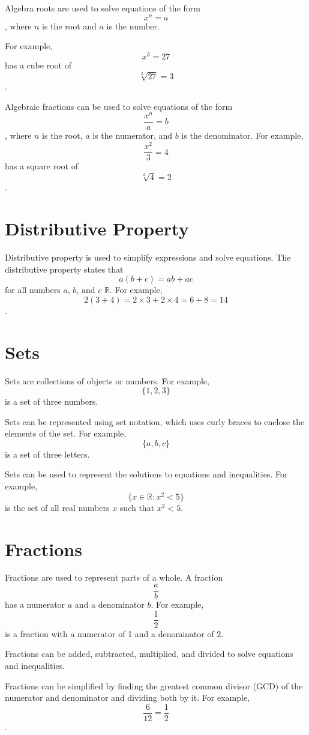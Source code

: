 \documentclass{article}
\begin{document}
Algebra roots are used to solve equations of the form $$x^n = a$$, where $n$ is the root and $a$ is the number.

For example, $$x^3 = 27$$ has a cube root of $$\sqrt[3]{27} = 3$$.

Algebraic fractions can be used to solve equations of the form $$\frac{x^n}{a} = b$$, where $n$ is the root, $a$ is the numerator, and $b$ is the denominator. For example, $$\frac{x^2}{3} = 4$$ has a square root of $$\sqrt[2]{4} = 2$$.

\section{Distributive Property}

Distributive property is used to simplify expressions and solve equations.
The distributive property states that $$a(b + c) = ab + ac$$ for all numbers $a$, $b$, and $c$ \in $\mathbb{R}$.  For example, $$2(3 + 4) = 2 \times 3 + 2 \times 4 = 6 + 8 = 14$$.


\section{Sets}

Sets are collections of objects or numbers. For example, $$\{1, 2, 3\}$$ is a set of three numbers.

Sets can be represented using set notation, which uses curly braces to enclose the elements of the set. For example, $$\{a, b, c\}$$ is a set of three letters.

Sets can be used to represent the solutions to equations and inequalities. For example, $$\{x \in \mathbb{R} : x^2 < 5\}$$ is the set of all real numbers $x$ such that $x^2 < 5$.

\section{Fractions}

Fractions are used to represent parts of a whole. A fraction $$\frac{a}{b}$$ has a numerator $a$ and a denominator $b$. For example, $$\frac{1}{2}$$ is a fraction with a numerator of 1 and a denominator of 2.

Fractions can be added, subtracted, multiplied, and divided to solve equations and inequalities.

Fractions can be simplified by finding the greatest common divisor (GCD) of the numerator and denominator and dividing both by it. For example, $$\frac{6}{12} = \frac{1}{2}$$.
\end{document}
